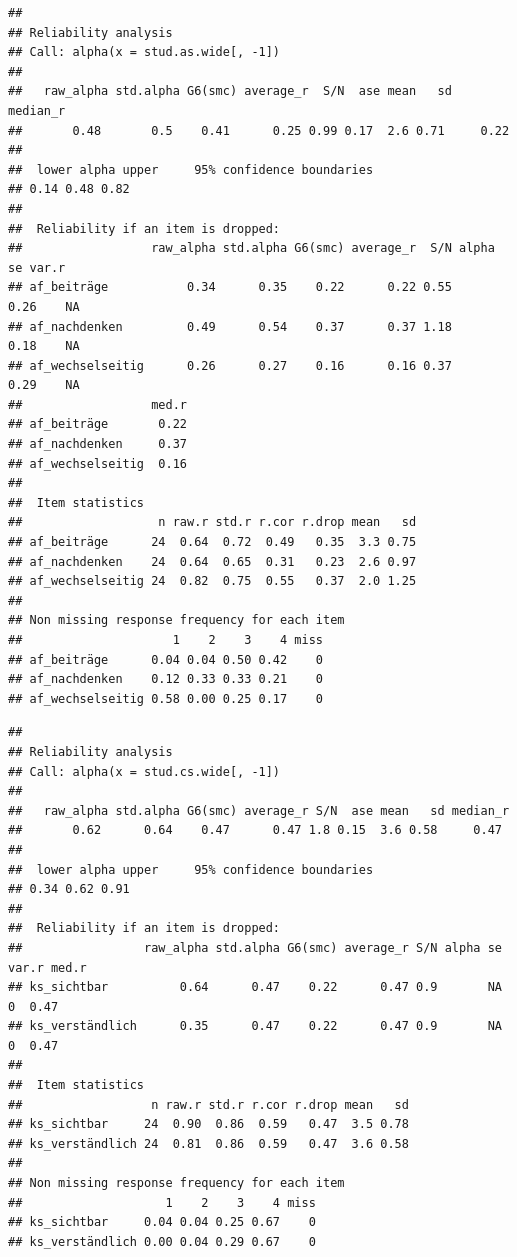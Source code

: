\documentclass[
  english,
  man,floatsintext]{apa6}
\begin{document}
\begin{verbatim}
## 
## Reliability analysis   
## Call: alpha(x = stud.as.wide[, -1])
## 
##   raw_alpha std.alpha G6(smc) average_r  S/N  ase mean   sd median_r
##       0.48       0.5    0.41      0.25 0.99 0.17  2.6 0.71     0.22
## 
##  lower alpha upper     95% confidence boundaries
## 0.14 0.48 0.82 
## 
##  Reliability if an item is dropped:
##                  raw_alpha std.alpha G6(smc) average_r  S/N alpha se var.r
## af_beiträge           0.34      0.35    0.22      0.22 0.55     0.26    NA
## af_nachdenken         0.49      0.54    0.37      0.37 1.18     0.18    NA
## af_wechselseitig      0.26      0.27    0.16      0.16 0.37     0.29    NA
##                  med.r
## af_beiträge       0.22
## af_nachdenken     0.37
## af_wechselseitig  0.16
## 
##  Item statistics 
##                   n raw.r std.r r.cor r.drop mean   sd
## af_beiträge      24  0.64  0.72  0.49   0.35  3.3 0.75
## af_nachdenken    24  0.64  0.65  0.31   0.23  2.6 0.97
## af_wechselseitig 24  0.82  0.75  0.55   0.37  2.0 1.25
## 
## Non missing response frequency for each item
##                     1    2    3    4 miss
## af_beiträge      0.04 0.04 0.50 0.42    0
## af_nachdenken    0.12 0.33 0.33 0.21    0
## af_wechselseitig 0.58 0.00 0.25 0.17    0
\end{verbatim}

\begin{verbatim}
## 
## Reliability analysis   
## Call: alpha(x = stud.cs.wide[, -1])
## 
##   raw_alpha std.alpha G6(smc) average_r S/N  ase mean   sd median_r
##       0.62      0.64    0.47      0.47 1.8 0.15  3.6 0.58     0.47
## 
##  lower alpha upper     95% confidence boundaries
## 0.34 0.62 0.91 
## 
##  Reliability if an item is dropped:
##                 raw_alpha std.alpha G6(smc) average_r S/N alpha se var.r med.r
## ks_sichtbar          0.64      0.47    0.22      0.47 0.9       NA     0  0.47
## ks_verständlich      0.35      0.47    0.22      0.47 0.9       NA     0  0.47
## 
##  Item statistics 
##                  n raw.r std.r r.cor r.drop mean   sd
## ks_sichtbar     24  0.90  0.86  0.59   0.47  3.5 0.78
## ks_verständlich 24  0.81  0.86  0.59   0.47  3.6 0.58
## 
## Non missing response frequency for each item
##                    1    2    3    4 miss
## ks_sichtbar     0.04 0.04 0.25 0.67    0
## ks_verständlich 0.00 0.04 0.29 0.67    0
\end{verbatim}
\end{document}
